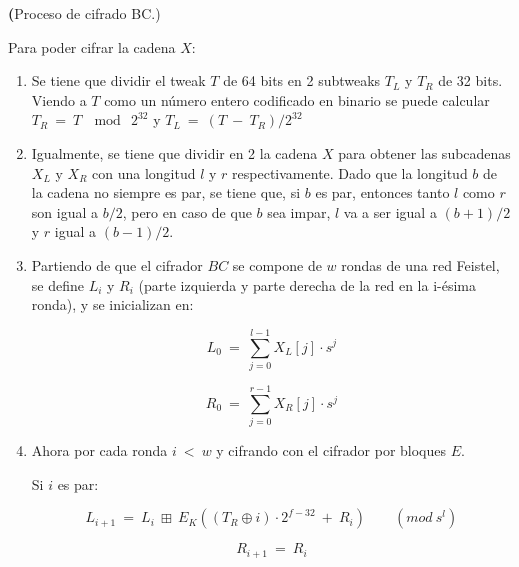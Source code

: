
\textbf(Proceso de cifrado BC.)

Para poder cifrar la cadena $X$:

\begin{enumerate}

  \item Se tiene que dividir el tweak $T$ de 64 bits en 2 subtweaks $T_L$ y 
    $T_R$ de 32 bits. Viendo a $T$ como un número entero codificado en binario 
    se puede calcular $T_R\: =\: T\: \mod\: 2^{32}$ y 
    $T_L\: =\: (T\: -\: T_R) / 2^{32}$

  \item Igualmente, se tiene que dividir en 2 la cadena $X$ para obtener las
    subcadenas $X_L$ y $X_R$ con una longitud $l$ y $r$ respectivamente. 
    Dado que la longitud $b$ de la cadena no siempre es par, se tiene que, si 
    $b$ es par, entonces tanto $l$ como $r$ son igual a $b/2$, pero en caso 
    de que $b$ sea impar, $l$ va a ser igual a $(b+1)/2$ y $r$ igual a 
    $(b-1)/2$.
  
  \item Partiendo de que el cifrador $BC$ se compone de $w$ rondas de una red 
    Feistel, se define $L_i$ y $R_i$ (parte izquierda y parte derecha de la 
    red en la i-ésima ronda), y se inicializan en:

    \begin{equation}
      L_0\: =\: \sum_{j=0}^{l-1} X_L[j] \cdot s^j
    \end{equation}

    \begin{equation}
      R_0\: =\: \sum_{j=0}^{r-1} X_R[j] \cdot s^j
    \end{equation}
  
  \item Ahora por cada ronda $i\: <\: w$ y cifrando con el cifrador por 
    bloques $E$.

    Si $i$ es par:

    \begin{equation}
      L_{i+1}\: =\: L_i\: \boxplus\: 
                    E_K((T_R \oplus i) \cdot 2^{f-32}\: +\: R_i)\qquad 
                    (mod\ s^l)
    \end{equation}

    \begin{equation}
      R_{i+1}\: =\: R_i
    \end{equation}


\end{enumerate}

